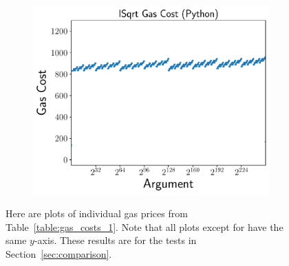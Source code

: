 \begin{figure}[p]
    \begin{subfigure}[t]{0.45\textwidth}
    \includegraphics[width=\textwidth]{plots/plot_Python.pdf}
    \end{subfigure}
    \caption{Here are plots of individual gas prices from
        Table~\ref{table:gas_costs_1}.
        Note that all plots except for \Uniswap{} have the same $y$-axis.
        These results are for the tests in Section~\ref{sec:comparison}.
        }
    \label{fig:gas_plots_1}
\end{figure}

